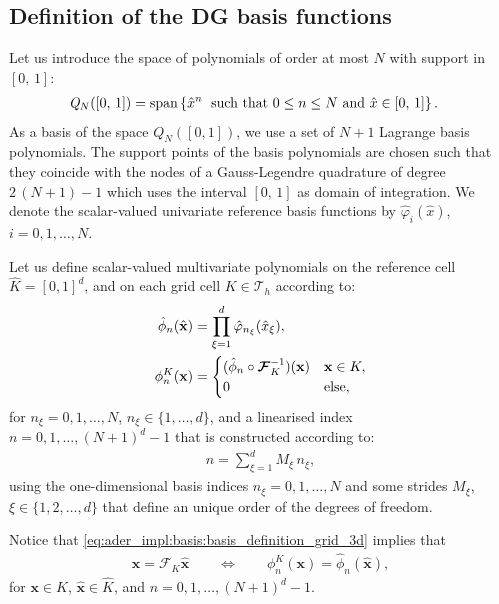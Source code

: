 \documentclass{scrreprt}
\theoremstyle{definition}
\theoremstyle{nonumberplain}
\renewcommand{\vec}[1]{{\textbf{#1}}}
\newcommand{\tria}{\mathcal{T}_h}
\newcommand{\cell}{K}
\newcommand{\refVec}[1]{\hat{\vec{#1}}}
\newcommand{\refCell}{\hat{\cell}}
\newcommand{\mapping}{\boldsymbol{\mathcal{F}}_{\cell}}
\newcommand{\imapping}{\boldsymbol{\mathcal{F}}^{-1}_{\cell}}
\newcommand{\polyspace}[3]{\mathit{#1}_{#2}(#3)}
\begin{document}
\subsection{Definition of the DG basis functions}
Let us introduce the space of polynomials of order
at most $N$ with support in $[0,\,1]$:
\begin{align*}
\polyspace{Q}{N}{[0,\,1]} &= \text{span}\left\{
\hat{x}^{n}\; \text{ such that }
0\leq n \leq N \textup{ and }\hat{x} \in [0,\,1] \right\}.
\end{align*}
As a basis of the space
$\polyspace{Q}{N}{[0,1]}$,
we use a set of $N+1$ Lagrange basis polynomials.
The support points of the basis polynomials are chosen such that
they coincide with the nodes of a Gauss-Legendre quadrature of degree
$2\,(N+1)-1$ which uses the interval $[0,\,1]$
as domain of integration. We denote the scalar-valued univariate reference basis
functions by $\hat{\varphi}_i(\hat{x})$, $i=0,1,\ldots,N$.

Let us define scalar-valued multivariate polynomials on the reference cell
$\refCell=[0,1]^d$,
and on each grid cell $\cell\in\tria$
according to:
\begin{align}
\label{eq:ader_impl:basis:basis_definition_ref_3d}
\hat{\phi}_n (\refVec{x}) &=
\prod^{d}_{\xi=1}
\hat{\varphi}_{n_\xi} (\hat{x}_\xi),
\\
\label{eq:ader_impl:basis:basis_definition_grid_3d}
\phi^{K}_n (\vec{x}) &=
\begin{cases}
(\hat{\phi}_n \circ \imapping) (\vec{x}) & \vec{x}\in\cell,
\\
0 & \textup{else},
\end{cases}
\end{align}
for $n_\xi=0,1,\ldots,N$, $n_\xi\in\{1,\ldots,d\}$,
and a linearised index $n=0,1,\ldots,(N+1)^{d}-1$
that is constructed according to:
\begin{align*}
n = \sum_{\xi=1}^{d} M_\xi\,n_\xi,
\end{align*}
using the one-dimensional basis indices $n_\xi={0,1,\ldots,N}$ and some strides
$M_\xi$, $\xi \in \{1,2,\ldots,d\}$ that define an unique order of the degrees
of freedom.

Notice that \eqref{eq:ader_impl:basis:basis_definition_grid_3d} implies that
\begin{align*}
\vec{x} = \mapping \refVec{x}
\qquad
\Leftrightarrow
\qquad
\phi^{K}_n (\vec{x}) =
\hat{\phi}_n (\refVec{x}),
\end{align*}
for $\vec{x}\in\cell$, $\refVec{x}\in\refCell$,
and $n=0,1,\ldots,(N+1)^{d}-1$.
\end{document}
